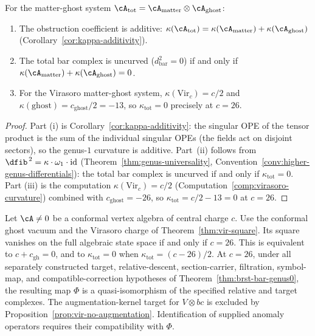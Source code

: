 \begin{theorem}\label{thm:anomaly-koszul}
For the matter-ghost system
$\cA_{\mathrm{tot}} = \cA_{\mathrm{matter}} \otimes \cA_{\mathrm{ghost}}$:
\begin{enumerate}[label=\textup{(\roman*)}]
\item The obstruction coefficient is additive:
  $\kappa(\cA_{\mathrm{tot}}) = \kappa(\cA_{\mathrm{matter}}) + \kappa(\cA_{\mathrm{ghost}})$
  \textup{(}Corollary~\textup{\ref{cor:kappa-additivity})}.
\item The total bar complex is uncurved
  ($d_{\mathrm{bar}}^2 = 0$) if and only if
  $\kappa(\cA_{\mathrm{matter}}) + \kappa(\cA_{\mathrm{ghost}}) = 0$.
\item For the Virasoro matter-ghost system,
  $\kappa(\mathrm{Vir}_c) = c/2$ and
  $\kappa(\mathrm{ghost}) = c_{\mathrm{ghost}}/2 = -13$, so
  $\kappa_{\mathrm{tot}} = 0$ precisely at $c = 26$.
\end{enumerate}
\end{theorem}

\begin{proof}
Part (i) is Corollary~\ref{cor:kappa-additivity}: the singular OPE
of the tensor product is the sum of the individual singular OPEs
(the fields act on disjoint sectors), so the genus-$1$ curvature
is additive.  Part~(ii) follows from
$\dfib^{\,2} = \kappa \cdot \omega_1 \cdot \mathrm{id}$
(Theorem~\ref{thm:genus-universality},
Convention~\ref{conv:higher-genus-differentials}): the total bar complex is
uncurved if and only if $\kappa_{\mathrm{tot}} = 0$.  Part (iii)
is the computation $\kappa(\mathrm{Vir}_c) = c/2$
(Computation~\ref{comp:virasoro-curvature}) combined with
$c_{\mathrm{ghost}} = -26$, so
$\kappa_{\mathrm{tot}} = c/2 - 13 = 0$ at $c = 26$.
\end{proof}

\begin{theorem}\label{thm:anomaly-physical-genus0}
Let $\cA\neq0$ be a conformal vertex algebra of central charge $c$.
Use the conformal ghost vacuum and the Virasoro charge of Theorem~\ref{thm:vir-square}.
Its square vanishes on the full algebraic state space if and only if $c=26$.
This is equivalent to $c+c_{\mathrm{gh}}=0$, and to $\kappa_{\mathrm{tot}}=0$ when $\kappa_{\mathrm{tot}}=(c-26)/2$.
At $c=26$, under all separately constructed target, relative-descent, section-carrier, filtration, symbol-map, and compatible-correction hypotheses of Theorem~\ref{thm:brst-bar-genus0}, the resulting map $\Phi$ is a quasi-isomorphism of the specified relative and target complexes. The augmentation-kernel target for $V\otimes bc$ is excluded by Proposition~\ref{prop:vir-no-augmentation}.
Identification of supplied anomaly operators requires their compatibility with $\Phi$.
\end{theorem}

